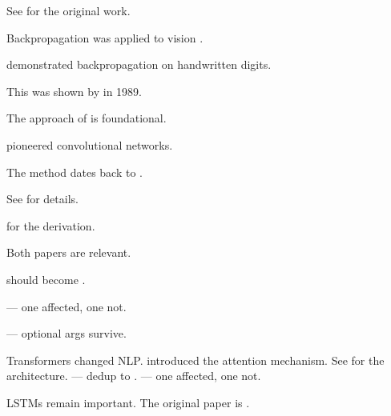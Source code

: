 \documentclass{article}
\begin{document}
See \cite{lecun1989b} for the original work.

Backpropagation was applied to vision \citep{lecun1989b}.

\citet{lecun1989b} demonstrated backpropagation on handwritten digits.

This was shown by \citealt{lecun1989b} in 1989.

The approach of \citealp{lecun1989b} is foundational.

\citeauthor{lecun1989b} pioneered convolutional networks.

The method dates back to \citeyear{lecun1989b}.

See \citep[p.~10]{lecun1989b} for details.

\citep[see][p.~10]{lecun1989b} for the derivation.

Both papers \citep{lecun1989,lecun1989b} are relevant.

\citep{lecun1989b,lecun1989} should become \citep{lecun1989}.

\citep{lecun1989b,hochreiter1997} — one affected, one not.

\citep[see][]{lecun1989b,hochreiter1997} — optional args survive.

Transformers \citep{vaswani2017preprint} changed NLP.
\citet{vaswani2017preprint} introduced the attention mechanism.
See \citep[Sec.~3]{vaswani2017preprint} for the architecture.
\citep{vaswani2017preprint,vaswani2017} — dedup to \citep{vaswani2017}.
\citep{hochreiter1997,vaswani2017preprint} — one affected, one not.

LSTMs \citep{hochreiter1997} remain important.
The original paper is \citet{lecun1989}.



\end{document}
